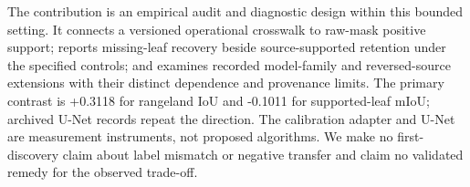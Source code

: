 The contribution is an empirical audit and diagnostic design within this bounded setting. It connects a versioned operational crosswalk to raw-mask positive support; reports missing-leaf recovery beside source-supported retention under the specified controls; and examines recorded model-family and reversed-source extensions with their distinct dependence and provenance limits. The primary contrast is +0.3118 for rangeland IoU and -0.1011 for supported-leaf mIoU; archived U-Net records repeat the direction. The calibration adapter and U-Net are measurement instruments, not proposed algorithms. We make no first-discovery claim about label mismatch or negative transfer and claim no validated remedy for the observed trade-off.
